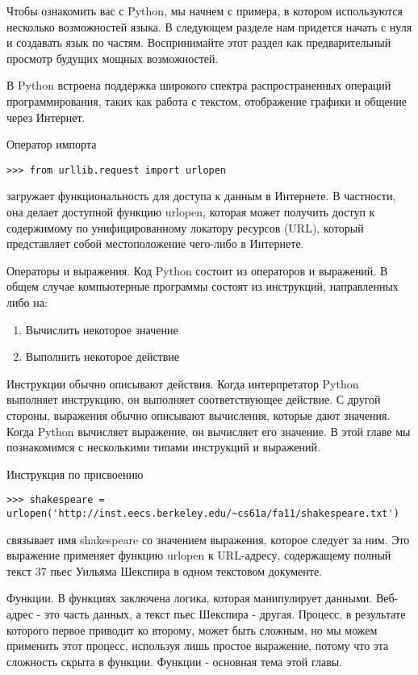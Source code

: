 Чтобы ознакомить вас с Python, мы начнем с примера, в котором используются несколько возможностей языка. В следующем разделе нам придется начать с нуля и создавать язык по частям. Воспринимайте этот раздел как предварительный просмотр будущих мощных возможностей.

В Python встроена поддержка широкого спектра распространенных операций программирования, таких как работа с текстом, отображение графики и общение через Интернет.

Оператор импорта

\begin{lstlisting}
>>> from urllib.request import urlopen
\end{lstlisting}

загружает функциональность для доступа к данным в Интернете. В частности, она делает доступной функцию urlopen, которая может получить доступ к содержимому по унифицированному локатору ресурсов (URL), который представляет собой местоположение чего-либо в Интернете.

Операторы и выражения. Код Python состоит из операторов и выражений. В общем случае компьютерные программы состоят из инструкций, направленных либо на:

\begin{enumerate}
  \item Вычислить некоторое значение
  \item Выполнить некоторое действие
\end{enumerate}

Инструкции обычно описывают действия. Когда интерпретатор Python выполняет инструкцию, он выполняет соответствующее действие. С другой стороны, выражения обычно описывают вычисления, которые дают значения. Когда Python вычисляет выражение, он вычисляет его значение. В этой главе мы познакомимся с несколькими типами инструкций и выражений.

Инструкция по присвоению

\begin{lstlisting}
>>> shakespeare = urlopen('http://inst.eecs.berkeley.edu/~cs61a/fa11/shakespeare.txt')
\end{lstlisting}

связывает имя shakespeare со значением выражения, которое следует за ним. Это выражение применяет функцию urlopen к URL-адресу, содержащему полный текст 37 пьес Уильяма Шекспира в одном текстовом документе.

Функции.
В функциях заключена логика, которая манипулирует данными.
Веб-адрес - это часть данных, а текст пьес Шекспира - другая.
Процесс, в результате которого первое приводит ко второму, может быть сложным, но мы можем применить этот процесс, используя лишь простое выражение, потому что эта сложность скрыта в функции.
Функции - основная тема этой главы.

